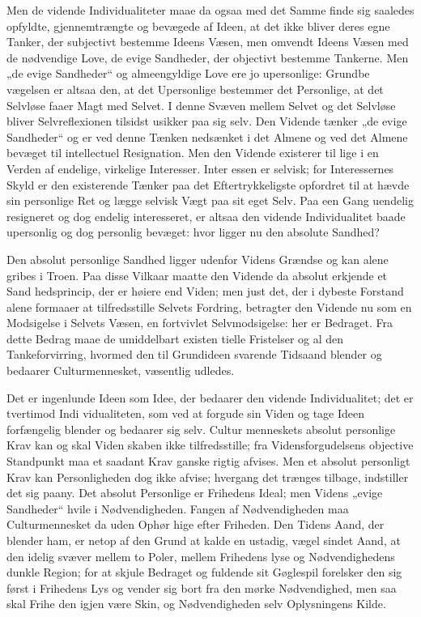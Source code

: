 \documentclass[12pt]{book}
\newcommand{\opage}[1]{\marginnote{\footnotesize\textit{[#1]}}}
\begin{document}
Men de vidende Individualiteter maae da ogsaa med det
Samme finde sig saaledes opfyldte, gjennemtrængte og
bevægede af Ideen, at det ikke bliver deres egne Tanker,
der subjectivt bestemme Ideens Væsen, men omvendt Ideens
Væsen med de nødvendige Love, de evige Sandheder, der
objectivt bestemme Tankerne. Men „de evige Sandheder“
og almeengyldige Love ere jo upersonlige: Grundbe\-%
vægelsen er altsaa den, at det Upersonlige bestemmer
det Personlige, at det Selvløse faaer Magt med Selvet.
I denne Svæven mellem Selvet og det Selvløse bliver
Selvreflexionen tilsidst usikker paa sig selv. Den Vidende
tænker „de evige Sandheder“ og er ved denne Tænken
nedsænket i det Almene og ved det Almene bevæget til
intellectuel Resignation. Men den Vidende existerer til\-%
lige i en Verden af endelige, virkelige Interesser. Inter\-%
essen er selvisk; for Interessernes Skyld er den existerende
Tænker paa det Eftertrykkeligste opfordret til at hævde
sin personlige Ret og lægge selvisk Vægt paa sit eget
Selv. Paa een Gang uendelig resigneret og dog endelig
interesseret, er altsaa den vidende Individualitet baade
upersonlig og dog personlig bevæget: hvor ligger nu den
absolute Sandhed?

Den absolut personlige Sandhed ligger udenfor
Videns Grændse og kan alene gribes i Troen. Paa disse
Vilkaar maatte den Vidende da absolut erkjende et Sand\-%
hedsprincip, der er høiere end Viden; men just det, der i
\opage{57}\setcounter{footnote}{0}%
dybeste Forstand alene formaaer at tilfredsstille Selvets
Fordring, betragter den Vidende nu som en Modsigelse
i Selvets Væsen, en fortvivlet Selvmodsigelse: her er
Bedraget. Fra dette Bedrag maae de umiddelbart existen\-%
tielle Fristelser og al den Tankeforvirring, hvormed den
til Grundideen svarende Tidsaand blender og bedaarer
Culturmennesket, væsentlig udledes.

Det er ingenlunde Ideen som Idee, der bedaarer
den vidende Individualitet; det er tvertimod Indi\-%
vidualiteten, som ved at forgude sin Viden og tage
Ideen forfængelig blender og bedaarer sig selv. Cultur\-%
menneskets absolut personlige Krav kan og skal Viden\-%
skaben ikke tilfredsstille; fra Vidensforgudelsens objective
Standpunkt maa et saadant Krav ganske rigtig afvises. Men
et absolut personligt Krav kan Personligheden dog ikke
afvise; hvergang det trænges tilbage, indstiller det sig paany.
Det absolut Personlige er Frihedens Ideal; men Videns
„evige Sandheder“ hvile i Nødvendigheden. Fangen af
Nødvendigheden maa Culturmennesket da uden Ophør
hige efter Friheden. Den Tidens Aand, der blender
ham, er netop af den Grund at kalde en ustadig, vægel\-%
sindet Aand, at den idelig svæver mellem to Poler,
mellem Frihedens lyse og Nødvendighedens dunkle
Region; for at skjule Bedraget og fuldende sit Gøglespil
forelsker den sig først i Frihedens Lys og vender sig
bort fra den mørke Nødvendighed, men saa skal Frihe\-%
den igjen være Skin, og Nødvendigheden selv Oplysningens
Kilde.
\end{document}
